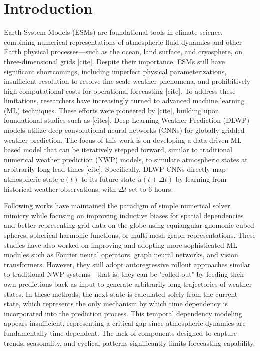\documentclass{article}
\begin{document}
\section{Introduction}
    Earth System Models (ESMs) are foundational tools in climate science, combining numerical representations of atmospheric fluid dynamics and other Earth physical processes—such as the ocean, land surface, and cryosphere, on three-dimensional grids [cite]. Despite their importance, ESMs still have significant shortcomings, including imperfect physical parameterizations, insufficient resolution to resolve fine-scale weather phenomena, and prohibitively high computational costs for operational forecasting [cite]. To address these limitations, researchers have increasingly turned to advanced machine learning (ML) techniques. These efforts were pioneered by [cite], building upon foundational studies such as [cites]. Deep Learning Weather Prediction (DLWP) models utilize deep convolutional neural networks (CNNs) for globally gridded weather prediction. The focus of this work is on developing a data-driven ML-based model that can be iteratively stepped forward, similar to traditional numerical weather prediction (NWP) models, to simulate atmospheric states at arbitrarily long lead times [cite]. Specifically, DLWP CNNs directly map atmospheric state $u(t)$ to its future state $u(t + \Delta t)$ by learning from historical weather observations, with $\Delta t$ set to 6 hours.

    Following works have maintained the paradigm of simple numerical solver mimicry while focusing on improving inductive biases for spatial dependencies and better representing grid data on the globe using equiangular gnomonic cubed spheres, spherical harmonic functions, or multi-mesh graph representations. These studies have also worked on improving and adopting more sophisticated ML modules such as Fourier neural operators, graph neural networks, and vision transformers. However, they still adopt autoregressive rollout approaches similar to traditional NWP systems—that is, they can be "rolled out" by feeding their own predictions back as input to generate arbitrarily long trajectories of weather states. In these methods, the next state is calculated solely from the current state, which represents the only mechanism by which time dependency is incorporated into the prediction process. This temporal dependency modeling appears insufficient, representing a critical gap since atmospheric dynamics are fundamentally time-dependent. The lack of components designed to capture trends, seasonality, and cyclical patterns significantly limits forecasting capability.
    
\end{document}
